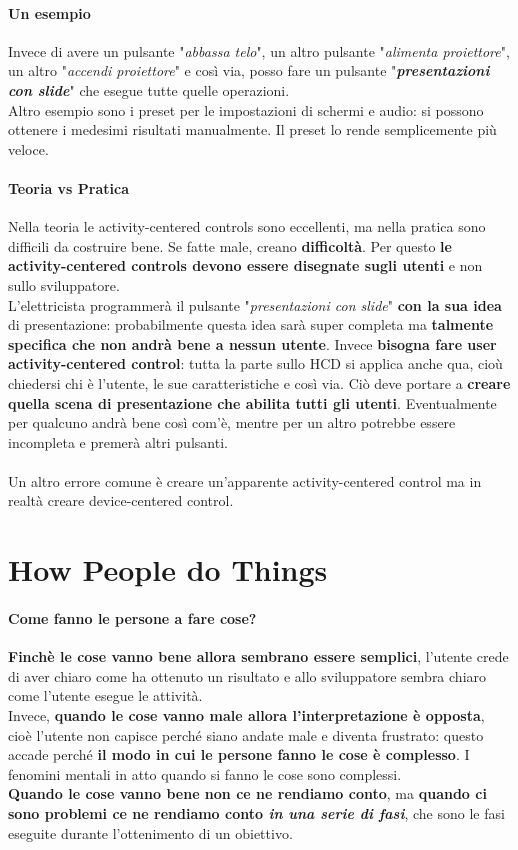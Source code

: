 \documentclass[10pt]{article}
\begin{document}
\paragraph{Un esempio} Invece di avere un pulsante "\textit{abbassa telo}", un altro pulsante "\textit{alimenta proiettore}", un altro "\textit{accendi proiettore}" e così via, posso fare un pulsante "\textit{\textbf{presentazioni con slide}}" che esegue tutte quelle operazioni.\\Altro esempio sono i preset per le impostazioni di schermi e audio: si possono ottenere i medesimi risultati manualmente. Il preset lo rende semplicemente più veloce.
\paragraph{Teoria vs Pratica} Nella teoria le activity-centered controls sono eccellenti, ma nella pratica sono difficili da costruire bene. Se fatte male, creano \textbf{difficoltà}. Per questo \textbf{le activity-centered controls devono essere disegnate sugli utenti} e non sullo sviluppatore.\\
L'elettricista programmerà il pulsante "\textit{presentazioni con slide}" \textbf{con la sua idea} di presentazione: probabilmente questa idea sarà super completa ma \textbf{talmente specifica che non andrà bene a nessun utente}. Invece \textbf{bisogna fare user activity-centered control}: tutta la parte sullo HCD si applica anche qua, cioù chiedersi chi è l'utente, le sue caratteristiche e così via. Ciò deve portare a \textbf{creare quella scena di presentazione che abilita tutti gli utenti}. Eventualmente per qualcuno andrà bene così com'è, mentre per un altro potrebbe essere incompleta e premerà altri pulsanti.\\\\
Un altro errore comune è creare un'apparente activity-centered control ma in realtà creare device-centered control.
\section{How People do Things}
\paragraph{Come fanno le persone a fare cose?} \textbf{Finchè le cose vanno bene allora sembrano essere semplici}, l'utente crede di aver chiaro come ha ottenuto un risultato e allo sviluppatore sembra chiaro come l'utente esegue le attività.\\
Invece, \textbf{quando le cose vanno male allora l'interpretazione è opposta}, cioè l'utente non capisce perché siano andate male e diventa frustrato: questo accade perché \textbf{il modo in cui le persone fanno le cose è complesso}. I fenomini mentali in atto quando si fanno le cose sono complessi.\\
\textbf{Quando le cose vanno bene non ce ne rendiamo conto}, ma \textbf{quando ci sono problemi ce ne rendiamo conto \textit{in una serie di fasi}}, che sono le fasi eseguite durante l'ottenimento di un obiettivo.
\end{document}
